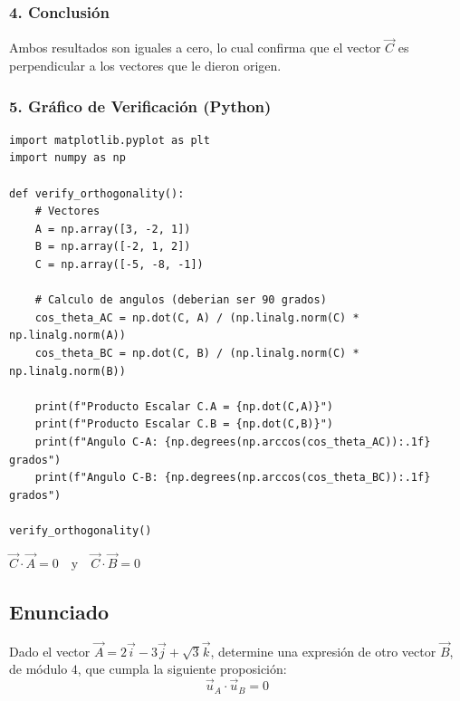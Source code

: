 \documentclass[12pt, a4paper]{article}
\begin{document}
\subsubsection*{4. Conclusión}
Ambos resultados son iguales a cero, lo cual confirma que el vector $\vec{C}$ es perpendicular a los vectores que le dieron origen.

\subsubsection*{5. Gráfico de Verificación (Python)}
\begin{lstlisting}
import matplotlib.pyplot as plt
import numpy as np

def verify_orthogonality():
    # Vectores
    A = np.array([3, -2, 1])
    B = np.array([-2, 1, 2])
    C = np.array([-5, -8, -1])
    
    # Calculo de angulos (deberian ser 90 grados)
    cos_theta_AC = np.dot(C, A) / (np.linalg.norm(C) * np.linalg.norm(A))
    cos_theta_BC = np.dot(C, B) / (np.linalg.norm(C) * np.linalg.norm(B))
    
    print(f"Producto Escalar C.A = {np.dot(C,A)}")
    print(f"Producto Escalar C.B = {np.dot(C,B)}")
    print(f"Angulo C-A: {np.degrees(np.arccos(cos_theta_AC)):.1f} grados")
    print(f"Angulo C-B: {np.degrees(np.arccos(cos_theta_BC)):.1f} grados")

verify_orthogonality()
\end{lstlisting}

\begin{tcolorbox}[colback=green!5!white, colframe=green!50!black, title=Respuesta Final]
\centering \Large $\vec{C} \cdot \vec{A} = 0 \quad \text{y} \quad \vec{C} \cdot \vec{B} = 0$
\end{tcolorbox}

\newpage

\subsection*{Enunciado}
Dado el vector $\vec{A} = 2\vec{i} - 3\vec{j} + \sqrt{3} \vec{k}$, determine una expresión de otro vector $\vec{B}$, de módulo $4$, que cumpla la siguiente proposición:
\begin{equation*}
    \vec{u}_A \cdot \vec{u}_B = 0
\end{equation*}
\end{document}
